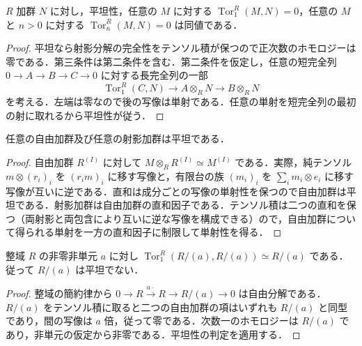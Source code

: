 \begin{prop}[平坦性のTorによる判定]
$R$ 加群 $N$ に対し，平坦性，任意の $M$ に対する $\operatorname{Tor}_1^R(M,N)=0$，任意の $M$ と $n>0$ に対する $\operatorname{Tor}_n^R(M,N)=0$ は同値である．
\end{prop}
\begin{proof}
平坦なら射影分解の完全性をテンソル積が保つので正次数のホモロジーは零である．第三条件は第二条件を含む．第二条件を仮定し，任意の短完全列 $0\to A\to B\to C\to0$ に対する長完全列の一部
\[
\operatorname{Tor}_1^R(C,N)\to A\otimes_R N\to B\otimes_R N
\]
を考える．左端は零なので後の写像は単射である．任意の単射を短完全列の最初の射に取れるから平坦性が従う．
\end{proof}
\begin{prop}[自由加群と射影加群の平坦性]
任意の自由加群及び任意の射影加群は平坦である．
\end{prop}
\begin{proof}
自由加群 $R^{(I)}$ に対して $M\otimes_R R^{(I)}\simeq M^{(I)}$ である．実際，純テンソル $m\otimes(r_i)_i$ を $(r_im)_i$ に移す写像と，有限台の族 $(m_i)_i$ を $\sum_i m_i\otimes e_i$ に移す写像が互いに逆である．直和は成分ごとの写像の単射性を保つので自由加群は平坦である．射影加群は自由加群の直和因子である．テンソル積は二つの直和を保つ（両射影と両包含により互いに逆な写像を構成できる）ので，自由加群について得られる単射を一方の直和因子に制限して単射性を得る．
\end{proof}
\begin{example}[剰余加群のTor]
整域 $R$ の非零非単元 $a$ に対し $\operatorname{Tor}_1^R(R/(a),R/(a))\simeq R/(a)$ である．従って $R/(a)$ は平坦でない．
\end{example}
\begin{proof}
整域の簡約律から $0\to R\xrightarrow{a\cdot}R\to R/(a)\to0$ は自由分解である．$R/(a)$ をテンソル積に取ると二つの自由加群の項はいずれも $R/(a)$ と同型であり，間の写像は $a$ 倍，従って零である．次数一のホモロジーは $R/(a)$ であり，非単元の仮定から非零である．平坦性の判定を適用する．
\end{proof}
